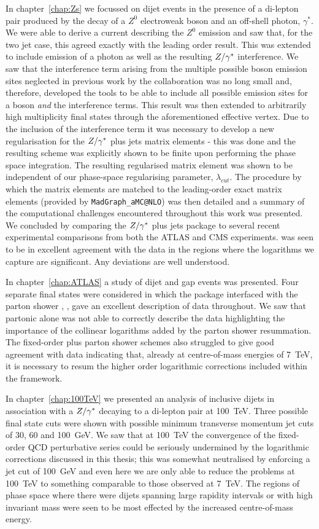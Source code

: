 In chapter~\ref{chap:Zs} we focussed on dijet events in the presence of a di-lepton pair produced by
the decay of a $Z^0$ electroweak boson and an off-shell photon, $\gamma^*$.  We were able to derive a
current describing the $Z^0$ emission and saw that, for the two jet case, this agreed exactly with the
leading order result.  This was extended to include emission of a photon as well as the resulting $Z/\gamma^*$ interference.
We saw that the interference term arising from the multiple possible boson emission sites neglected in previous work by the \hej collaboration was no long small
and, therefore, developed the tools to be able to include all possible emission sites for a boson \emph{and}
the interference terms.  This result was then extended to arbitrarily high multiplicity final states through
the aforementioned effective vertex.  Due to the inclusion of the interference term it was necessary
to develop a new regularisation for the $Z/\gamma^*$ plus jets matrix elements - this was done and the resulting
scheme was explicitly shown to be finite upon performing the phase space integration.  The resulting
regularised matrix element was shown to be independent of our phase-space regularising
parameter, $\lambda_{cut}$.  The procedure by which the \HEJ matrix elements are matched to the leading-order
exact matrix elements (provided by \texttt{MadGraph\_aMC@NLO}) was then detailed and a summary of the computational
challenges encountered throughout this work was presented.  We concluded by comparing the \HEJ $Z/\gamma^*$ plus jets
package to several recent experimental comparisons from both the ATLAS and CMS experiments.  \HEJ was seen to
be in excellent agreement with the data in the regions where the logarithms we capture are significant.
Any deviations are well understood.

In chapter~\ref{chap:ATLAS} a study of dijet and gap events was presented.  Four separate final states
were considered in which the \HEJ package interfaced with the parton shower \ARIADNE, \HEJA, gave an
excellent description of data throughout.  We saw that partonic \HEJ alone was not able to correctly
describe the data highlighting the importance of the collinear logarithms added by the parton shower
resummation.  The fixed-order plus parton shower schemes also struggled to give good agreement with
data indicating that, already at centre-of-mass energies of 7~TeV, it is necessary to resum the higher
order logarithmic corrections included within the \hej framework.

In chapter~\ref{chap:100TeV} we presented an analysis of inclusive dijets in association with a $Z/\gamma^*$
decaying to a di-lepton pair at 100~TeV.  Three possible final state cuts were shown with possible
minimum transverse momentum jet cuts of 30, 60 and 100~GeV.  We saw that at 100~TeV the
convergence of the fixed-order QCD perturbative series could be seriously undermined by the logarithmic
corrections discussed in this thesis; this was somewhat neutralised by enforcing a jet cut of
100~GeV and even here we are only able to reduce the problems at 100~TeV to something comparable
to those observed at 7~TeV.  The regions of phase space where there were dijets spanning
large rapidity intervals or with high invariant mass were seen to be most effected by the increased
centre-of-mass energy.

